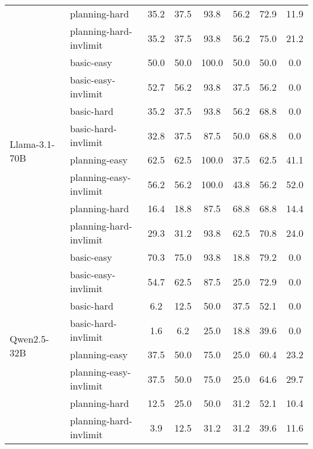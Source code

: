 \begin{tabular}{llcccccc}
 & planning-hard & 35.2 & 37.5 & 93.8 & 56.2 & 72.9 & 11.9 \\
 & planning-hard-invlimit & 35.2 & 37.5 & 93.8 & 56.2 & 75.0 & 21.2 \\
\cline{1-8}
\multirow[c]{8}{*}{Llama-3.1-70B} & basic-easy & 50.0 & 50.0 & 100.0 & 50.0 & 50.0 & 0.0 \\
 & basic-easy-invlimit & 52.7 & 56.2 & 93.8 & 37.5 & 56.2 & 0.0 \\
 & basic-hard & 35.2 & 37.5 & 93.8 & 56.2 & 68.8 & 0.0 \\
 & basic-hard-invlimit & 32.8 & 37.5 & 87.5 & 50.0 & 68.8 & 0.0 \\
 & planning-easy & 62.5 & 62.5 & 100.0 & 37.5 & 62.5 & 41.1 \\
 & planning-easy-invlimit & 56.2 & 56.2 & 100.0 & 43.8 & 56.2 & 52.0 \\
 & planning-hard & 16.4 & 18.8 & 87.5 & 68.8 & 68.8 & 14.4 \\
 & planning-hard-invlimit & 29.3 & 31.2 & 93.8 & 62.5 & 70.8 & 24.0 \\
\cline{1-8}
\multirow[c]{8}{*}{Qwen2.5-32B} & basic-easy & 70.3 & 75.0 & 93.8 & 18.8 & 79.2 & 0.0 \\
 & basic-easy-invlimit & 54.7 & 62.5 & 87.5 & 25.0 & 72.9 & 0.0 \\
 & basic-hard & 6.2 & 12.5 & 50.0 & 37.5 & 52.1 & 0.0 \\
 & basic-hard-invlimit & 1.6 & 6.2 & 25.0 & 18.8 & 39.6 & 0.0 \\
 & planning-easy & 37.5 & 50.0 & 75.0 & 25.0 & 60.4 & 23.2 \\
 & planning-easy-invlimit & 37.5 & 50.0 & 75.0 & 25.0 & 64.6 & 29.7 \\
 & planning-hard & 12.5 & 25.0 & 50.0 & 31.2 & 52.1 & 10.4 \\
 & planning-hard-invlimit & 3.9 & 12.5 & 31.2 & 31.2 & 39.6 & 11.6 \\
\cline{1-8}
\hline
\end{tabular}
